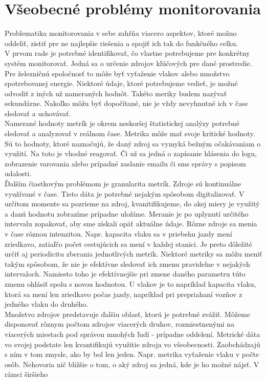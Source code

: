 \documentclass[11pt,final,oneside]{fithesis}
\begin{document}
\section{Všeobecné problémy monitorovania}
Problematika monitorovania v sebe zahŕňa viacero aspektov, ktoré možno oddeliť, zistiť pre ne najlepšie riešenia a spojiť ich tak do funkčného celku. 
\\V prvom rade je potrebné identifikovať, čo vlastne potrebujeme pre konkrétny systém
monitorovať. Jedná sa o určenie zdrojov kľúčových pre dané prostredie. Pre železničnú spoločnosť to môže byť vyťaženie vlakov alebo množstvo spotrebovanej energie. Niektoré údaje, ktoré potrebujeme vedieť, je možné odvodiť z iných už
nameraných hodnôt. Takéto meriky budem nazývať sekundárne. Nakoľko môžu byť dopočítané, nie je vždy nevyhnutné ich v čase sledovať a uchovávať.
\\Namerané hodnoty metrík je okrem neskoršej štatistickej analýzy potrebné sledovať a analyzovať v reálnom čase. Metrika môže mať svoje kritické hodnoty. Sú to hodnoty, ktoré naznačujú, že daný zdroj sa vymyká bežným očakávaniam o využití.
Na toto je vhodné reagovať. Či už sa jedná o zapísanie hlásenia do logu, zobrazenie varovania alebo prípadné zaslanie emailu či sms správy s popisom udalosti.
\\Ďalším čiastkovým problémom je granularita metrík. Zdroje sú kontinuálne využívané v čase. Tieto dáta je potrebné nejakým spôsobom digitalizovať. V určitom momente sa pozrieme na zdroj, kvanitifikujeme, do akej miery je využitý a danú
hodnotu zobrazíme prípadne uložíme. Meranie je po uplynutí určitého intervalu zopakovať, aby sme získali opäť aktuálne údaje. Rôzne zdroje sa menia v čase rôznou intenzitou. Napr. kapacita vlaku sa v priebehu jazdy mení zriedkavo, zatiaľčo
počet cestujúcich sa mení v každej stanici. Je preto dôležité určiť aj periodicitu zberania jednotlivých metrík. Niektoré metriky sa môžu meniť takým spôsobom, že nie je efektívne sledovať ich zmenu pravidelne v nejakých intervaloch. Namiesto
toho je efektívnejšie pri zmene daného parametru túto zmenu ohlásiť spolu s novou hodnotou. U vlakov je to napríklad kapacita vlaku, ktorá sa mení len zriedkavo počas jazdy, napríklad pri prepriahaní vozňov z jedného vlaku do druhého.
\\Množstvo zdrojov predstavuje ďalšiu oblasť, ktorú je potrebné zvážiť. Môžeme disponovať rôznym počtom zdrojov viacerých druhov, rozmiestnenými na viacerých miestach pod správou mnohých ľudí - prípadne oddelení. Metrické dáta vo svojej
podstate len kvantifikujú využitie zdroja vo všeobecnosti. Zaobchádzajú s ním v tom zmysle, ako by bol len jeden. Napr. metrika vyťaženie vlaku v počte osôb. Nehovoria nič bližšie o tom, o aký zdroj sa jedná, kde je ho možné nájsť. V rámci širšieho
\end{document}
